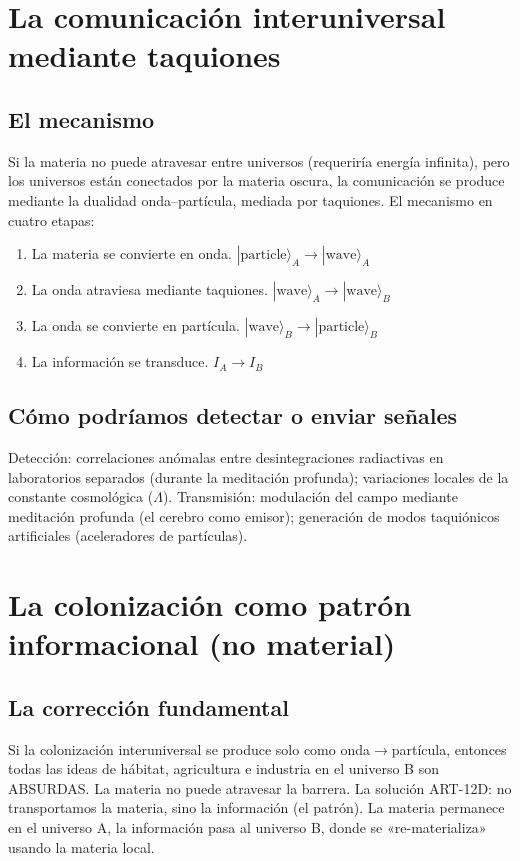 \section{La comunicación interuniversal mediante taquiones}
\subsection{El mecanismo}
Si la materia no puede atravesar entre universos (requeriría energía infinita), pero los universos están conectados por la materia oscura, la comunicación se produce mediante la dualidad onda--partícula, mediada por taquiones. El mecanismo en cuatro etapas:
\begin{enumerate}
    \item La materia se convierte en onda. $|\text{particle}\rangle_A \to |\text{wave}\rangle_A$
    \item La onda atraviesa mediante taquiones. $|\text{wave}\rangle_A \to |\text{wave}\rangle_B$
    \item La onda se convierte en partícula. $|\text{wave}\rangle_B \to |\text{particle}\rangle_B$
    \item La información se transduce. $I_A \to I_B$
\end{enumerate}

\subsection{Cómo podríamos detectar o enviar señales}
Detección: correlaciones anómalas entre desintegraciones radiactivas en laboratorios separados (durante la meditación profunda); variaciones locales de la constante cosmológica ($\Lambda$). Transmisión: modulación del campo mediante meditación profunda (el cerebro como emisor); generación de modos taquiónicos artificiales (aceleradores de partículas).

\section{La colonización como patrón informacional (no material)}
\subsection{La corrección fundamental}
Si la colonización interuniversal se produce solo como onda$\to$partícula, entonces todas las ideas de hábitat, agricultura e industria en el universo B son ABSURDAS. La materia no puede atravesar la barrera. La solución ART-12D: no transportamos la materia, sino la información (el patrón). La materia permanece en el universo A, la información pasa al universo B, donde se «re-materializa» usando la materia local.

